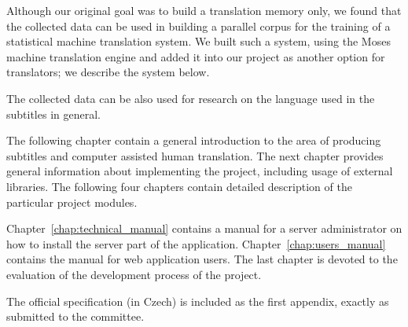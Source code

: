 Although our original goal was to build a translation memory only, we found that the collected data can be used in building a parallel corpus for the training of a statistical machine translation system. We built such a system, using the Moses machine translation engine and added it into our project as another option for translators; we describe the system below.

The collected data can be also used for research on the language used in the subtitles in general.

The following chapter contain a general introduction to the area of producing subtitles and computer assisted human translation. The next chapter provides general information about implementing the project, including usage of external libraries. The following four chapters contain detailed description of the particular project modules.

Chapter~\ref{chap:technical_manual} contains a manual for a server administrator on how to install the server part of the application. Chapter~\ref{chap:users_manual} contains the manual for web application users. The last chapter is devoted to the evaluation of the development process of the project.

The official specification (in Czech) is included as the first appendix, exactly as submitted to the committee.